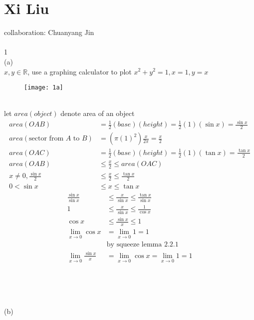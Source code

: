 \documentclass[12pt, border = 4pt, multi]{article} %
\begin{document}
\section*{Xi Liu}
collaboration: Chuanyang Jin\\
\\
1\\
(a)\\
$x, y \in \mathbb{R}$, use a graphing calculator to plot $x ^ 2 + y ^ 2 = 1, x = 1, y = x$\\
\begin{figure}[h!]
	\centering
	\texttt{[image: 1a]}
\end{figure}\\
let $area(object)$ denote area of an object\\
\begin{align*}
area(OAB) &= \frac{1}{2}(base)(height) = \frac{1}{2}(1)(\sin x) = \frac{\sin x}{2}\\
area(\text{sector from } A \text{ to } B) &= (\pi(1) ^ 2)\frac{x}{2\pi} = \frac{x}{2}\\
area(OAC) &= \frac{1}{2}(base)(height) = \frac{1}{2}(1)(\tan x) = \frac{\tan x}{2}\\
area(OAB) &\leq \frac{x}{2} \leq area(OAC)\\
x \not= 0, \frac{\sin x}{2} &\leq \frac{x}{2} \leq \frac{\tan x}{2}\\
0 < \sin x &\leq x \leq \tan x
\end{align*}
\begin{align*}
\frac{\sin x}{\sin x} &\leq \frac{x}{\sin x} \leq \frac{\tan x}{\sin x}\\
1 &\leq \frac{x}{\sin x} \leq \frac{1}{\cos x}\\
\cos x &\leq \frac{\sin x}{x} \leq 1\\
\lim_{x \rightarrow 0} \cos x &= \lim_{x \rightarrow 0} 1 = 1\\
&\text{by squeeze lemma 2.2.1}\\
\lim_{x \rightarrow 0} \frac{\sin x}{x} &= \lim_{x \rightarrow 0} \cos x = \lim_{x \rightarrow 0} 1 = 1\\
\end{align*}
\\
\\
\\
\\
(b)
\end{document}
